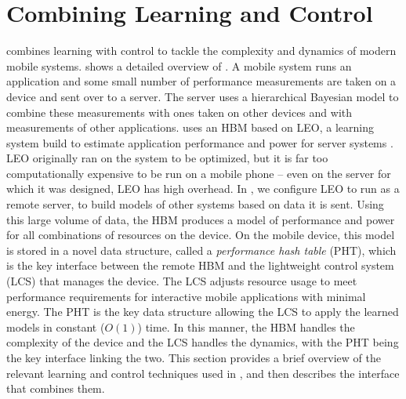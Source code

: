 \section{Combining Learning and Control}


\SYSTEM{} combines learning with control to tackle the complexity and
dynamics of modern mobile systems.   shows a detailed
overview of \SYSTEM{}.  A mobile system runs an application and some small number of performance measurements
are taken on a device and sent over to a server.  The server uses a
hierarchical Bayesian model to combine these measurements with ones
taken on other devices and with measurements of other applications. \SYSTEM{} uses an HBM based on LEO, a learning system build to
estimate application performance and power for server systems
\cite{LEO}.  LEO originally ran on the system to be optimized, but it
is far too computationally expensive to be run on a mobile phone --
even on the server for which it was designed, LEO has high overhead.
In \SYSTEM{}, we configure LEO to run as a remote server, to build
models of other systems based on data it is sent. Using this large volume of data, the HBM produces a model of
performance and power for all combinations of resources on the device.
On the mobile device, this model is stored in a novel data structure, called a
\emph{performance hash table} (PHT), which is the key interface
between the remote HBM and the lightweight control system (LCS) that
manages the device.  The LCS adjusts resource usage to meet
performance requirements for interactive mobile applications with
minimal energy.  The PHT is the key data structure allowing the LCS to
apply the learned models in constant ($O(1)$) time.  
In this manner, the HBM handles the
complexity of the device and the LCS handles the dynamics, with the
PHT being the key interface linking the two.  This section provides a
brief overview of the relevant learning and control techniques used in
\SYSTEM{}, and then describes the interface that combines them.


